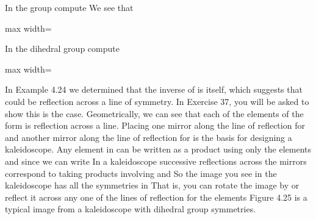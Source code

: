 \documentclass[11pt,oneside]{article}
\begin{document}
\begin{BookBody}
 In the group  compute  We see that

\begin{center}\begin{adjustbox}{max width=\linewidth}\end{adjustbox}\end{center} \BookEnd{\blacktriangle}

 In the dihedral group  compute 

\begin{center}\begin{adjustbox}{max width=\linewidth}\end{adjustbox}\end{center} \BookEnd{\blacktriangle}

\noindent In Example 4.24 we determined that the inverse of  is itself, which suggests that  could be reflection across a line of symmetry. In Exercise 37, you will be asked to show this is the case. Geometrically, we can see that each of the elements of the form  is reflection across a line. Placing one mirror along the line of reflection for \BookInline{\mu } and another mirror along the line of reflection for \BookInline{\mu \rho } is the basis for designing a kaleidoscope. Any element in  can be written as a product using only the elements \BookInline{\mu } and \BookInline{\mu \rho } since we can write  In a kaleidoscope successive reflections across the mirrors correspond to taking products involving \BookInline{\mu } and  So the image you see in the kaleidoscope has all the symmetries in  That is, you can rotate the image by  or reflect it across any one of the lines of reflection for the elements  Figure 4.25 is a typical image from a kaleidoscope with dihedral group  symmetries.

\end{BookBody}
\end{document}
